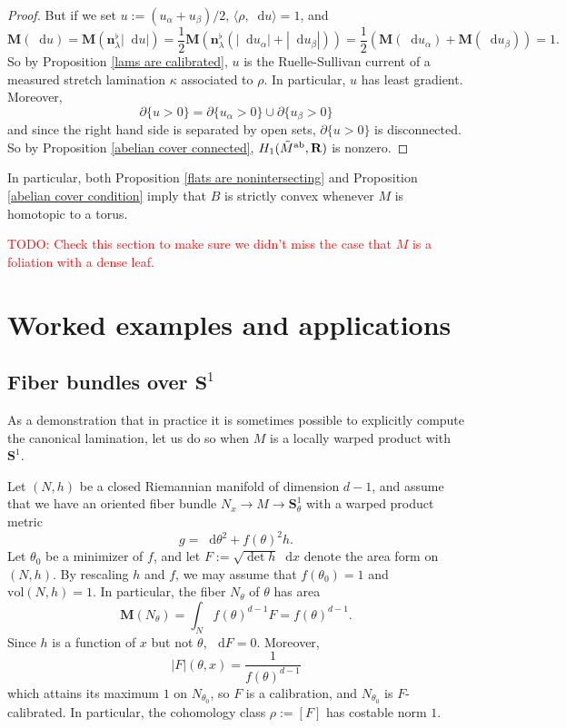 \documentclass[reqno,11pt]{amsart}
\newcommand{\RR}{\mathbf{R}}
\newcommand{\Sph}{\mathbf S}
\newcommand*\dif{\mathop{}\!\mathrm{d}}
\newcommand{\normal}{\mathbf n}
\newcommand{\vol}{\mathrm{vol}}
\newcommand{\Mass}{\mathbf M}
\theoremstyle{definition}
\numberwithin{equation}{section}
\newcommand\todo[1]{\textcolor{red}{TODO: #1}}
\begin{document}
\begin{proof}
But if we set $u := (u_\alpha + u_\beta)/2$, $\langle \rho, \dif u\rangle = 1$, and 
$$\Mass(\dif u) = \Mass(\normal^\flat_\lambda |\dif u|) = \frac{1}{2} \Mass(\normal^\flat_\lambda (|\dif u_\alpha| + |\dif u_\beta|)) = \frac{1}{2} (\Mass(\dif u_\alpha) + \Mass(\dif u_\beta)) = 1.$$
So by Proposition \ref{lams are calibrated}, $u$ is the Ruelle-Sullivan current of a measured stretch lamination $\kappa$ associated to $\rho$.
In particular, $u$ has least gradient.
Moreover,
$$\partial \{u > 0\} = \partial \{u_\alpha > 0\} \cup \partial \{u_\beta > 0\}$$
and since the right hand side is separated by open sets, $\partial \{u > 0\}$ is disconnected. 
So by Proposition \ref{abelian cover connected}, $H_1(\tilde M^{\rm ab}, \RR)$ is nonzero.
\end{proof}

In particular, both Proposition \ref{flats are nonintersecting} and Proposition \ref{abelian cover condition} imply that $B$ is strictly convex whenever $M$ is homotopic to a torus.

\todo{Check this section to make sure we didn't miss the case that $M$ is a foliation with a dense leaf.}


\section{Worked examples and applications}
\subsection{Fiber bundles over \texorpdfstring{$\Sph^1$}{the circle}}
As a demonstration that in practice it is sometimes possible to explicitly compute the canonical lamination, let us do so when $M$ is a locally warped product with $\Sph^1$.

Let $(N, h)$ be a closed Riemannian manifold of dimension $d - 1$, and assume that we have an oriented fiber bundle $N_x \to M \to \Sph^1_\theta$ with a warped product metric 
$$g = \dif \theta^2 + f(\theta)^2 h.$$
Let $\theta_0$ be a minimizer of $f$, and let $F := \sqrt{\det h} \dif x$ denote the area form on $(N, h)$.
By rescaling $h$ and $f$, we may assume that $f(\theta_0) = 1$ and $\vol(N, h) = 1$.
In particular, the fiber $N_\theta$ of $\theta$ has area
$$\Mass(N_\theta) = \int_N f(\theta)^{d - 1} F = f(\theta)^{d - 1}.$$
Since $h$ is a function of $x$ but not $\theta$, $\dif F = 0$.
Moreover,
\begin{equation}\label{fiber bundle sample comass}
|F|(\theta, x) = \frac{1}{f(\theta)^{d - 1}}
\end{equation}
which attains its maximum $1$ on $N_{\theta_0}$, so $F$ is a calibration, and $N_{\theta_0}$ is $F$-calibrated.
In particular, the cohomology class $\rho := [F]$ has costable norm $1$.
\end{document}
